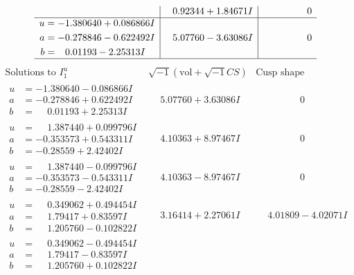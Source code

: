 \documentclass[1p]{elsarticle_modified}
\theoremstyle{definition}
\newcommand{\I}{\sqrt{-1}}
\begin{document}
$$\begin{array}{c|c|c}
 & \phantom{-}0.92344 + 1.84671 I & \phantom{-0.000000 } 0 \\ \hline\begin{aligned}
u &= -1.380640 + 0.086866 I \\
a &= -0.278846 - 0.622492 I \\
b &= \phantom{-}0.01193 - 2.25313 I\end{aligned}
 & \phantom{-}5.07760 - 3.63086 I & \phantom{-0.000000 } 0\\
 \hline 
 \end{array}$$\newpage$$\begin{array}{c|c|c}  
\text{Solutions to }I^u_{1}& \I (\text{vol} + \sqrt{-1}CS) & \text{Cusp shape}\\
 \hline 
\begin{aligned}
u &= -1.380640 - 0.086866 I \\
a &= -0.278846 + 0.622492 I \\
b &= \phantom{-}0.01193 + 2.25313 I\end{aligned}
 & \phantom{-}5.07760 + 3.63086 I & \phantom{-0.000000 } 0 \\ \hline\begin{aligned}
u &= \phantom{-}1.387440 + 0.099796 I \\
a &= -0.353573 + 0.543311 I \\
b &= -0.28559 + 2.42402 I\end{aligned}
 & \phantom{-}4.10363 + 8.97467 I & \phantom{-0.000000 } 0 \\ \hline\begin{aligned}
u &= \phantom{-}1.387440 - 0.099796 I \\
a &= -0.353573 - 0.543311 I \\
b &= -0.28559 - 2.42402 I\end{aligned}
 & \phantom{-}4.10363 - 8.97467 I & \phantom{-0.000000 } 0 \\ \hline\begin{aligned}
u &= \phantom{-}0.349062 + 0.494454 I \\
a &= \phantom{-}1.79417 + 0.83597 I \\
b &= \phantom{-}1.205760 - 0.102822 I\end{aligned}
 & \phantom{-}3.16414 + 2.27061 I & \phantom{-}4.01809 - 4.02071 I \\ \hline\begin{aligned}
u &= \phantom{-}0.349062 - 0.494454 I \\
a &= \phantom{-}1.79417 - 0.83597 I \\
b &= \phantom{-}1.205760 + 0.102822 I\end{aligned}

\end{array}$$
\end{document}
